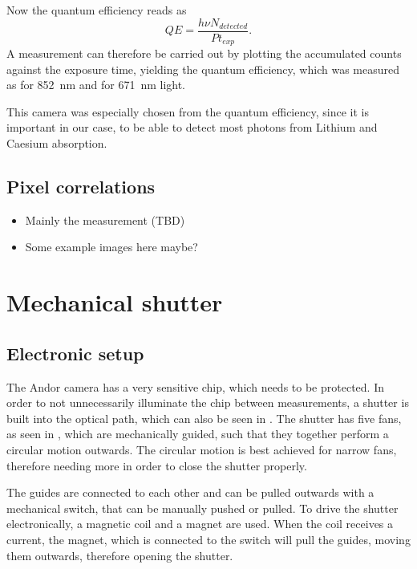 Now the quantum efficiency reads as
\begin{equation}
QE = \frac{h \nu N_{detected}}{P t_{exp}}.
\end{equation}
A measurement can therefore be carried out by plotting the accumulated counts against the exposure time, yielding the quantum efficiency, which was measured as  for \SI{852}{\nano\meter} and for \SI{671}{\nano\meter} light.

This camera was especially chosen from the quantum efficiency, since it is important in our case, to be able to detect most photons from Lithium and Caesium absorption.

\subsection{Pixel correlations}
\begin{itemize}
	\item Mainly the measurement (TBD)
	\item Some example images here maybe?
\end{itemize}

\section{Mechanical shutter}
\label{sec:shutter}

\subsection{Electronic setup}
\label{subsec:shutter_electronic}

The Andor camera has a very sensitive chip, which needs to be protected. In order to not unnecessarily illuminate the chip between measurements, a shutter is built into the optical path, which can also be seen in . The shutter has five fans, as seen in , which are mechanically guided, such that they together perform a circular motion outwards. The circular motion is best achieved for narrow fans, therefore needing more in order to close the shutter properly.

The guides are connected to each other and can be pulled outwards with a mechanical switch, that can be manually pushed or pulled. To drive the shutter electronically, a magnetic coil and a magnet are used. When the coil receives a current, the magnet, which is connected to the switch will pull the guides, moving them outwards, therefore opening the shutter.

